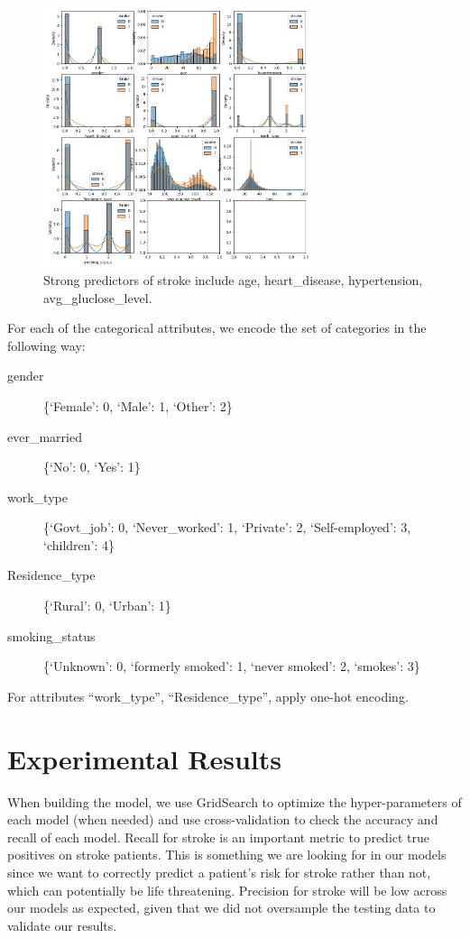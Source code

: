 \documentclass[11pt]{article}
\begin{document}
\begin{figure}[ht]
\centering
\includegraphics[width=0.7\textwidth]{Density.png}
\caption{Strong predictors of stroke include age, heart\_disease, hypertension, avg\_gluclose\_level.}
\end{figure}

For each of the categorical attributes, we encode the set of categories in the following way:
\begin{description}
    \item[gender] \{`Female': 0, `Male': 1, `Other': 2\}
    \item[ever\_married] \{`No': 0, `Yes': 1\}
    \item[work\_type] \{`Govt\_job': 0, `Never\_worked': 1, `Private': 2, `Self-employed': 3, `children': 4\}
    \item[Residence\_type] \{`Rural': 0, `Urban': 1\}
    \item[smoking\_status] \{`Unknown': 0, `formerly smoked': 1, `never smoked': 2, `smokes': 3\}
\end{description}
For attributes ``work\_type'', ``Residence\_type'', apply one-hot encoding.

\section*{Experimental Results}

When building the model, we use GridSearch to optimize the hyper-parameters of each model (when needed) and use cross-validation to check the accuracy and recall of each model. Recall for stroke is an important metric to predict true positives on stroke patients. This is something we are looking for in our models since we want to correctly predict a patient's risk for stroke rather than not, which can potentially be life threatening. Precision for stroke will be low across our models as expected, given that we did not oversample the testing data to validate our results.
\end{document}
